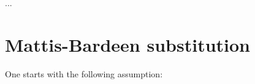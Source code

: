 \documentclass[aps,prb,reprint,noeprint,superscriptaddress]{revtex4-1}
\begin{document}
\begin{acknowledgments}
...
\end{acknowledgments}











\appendix
\section{Mattis-Bardeen substitution}

One starts with the following assumption:
\end{document}
